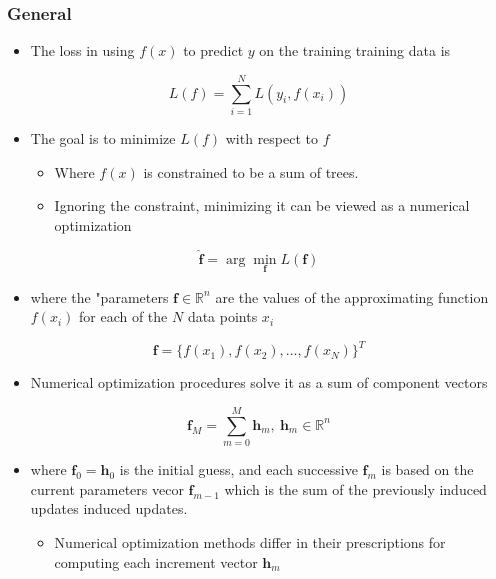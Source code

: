 \documentclass[11pt]{article}
\begin{document}
\subsubsection{General}
\label{sec:org23fed2b}
\begin{itemize}
\item The loss in using \(f(x)\) to predict \(y\) on the training training data is
\end{itemize}
\begin{equation}
  L(f) = \sum_{i=1}^N L(y_i,f(x_i))
\end{equation}
\begin{itemize}
\item The goal is to minimize \(L(f)\) with respect to \(f\)
\begin{itemize}
\item Where \(f(x)\) is constrained to be a sum of trees.
\item Ignoring the constraint, minimizing it can be viewed as a numerical optimization
\end{itemize}
\end{itemize}
\begin{equation}
  \pmb{\hat f} = \arg \min_{\pmb{f}} L(\pmb f) 
\end{equation}
\begin{itemize}
\item where the "parameters \(\pmb f \in \mathbb R ^n\) are the values of the approximating function \(f(x_i)\) for each of the \(N\) data points \(x_i\)
\end{itemize}
\begin{equation}
  \pmb f = \{f(x_1), f(x_2), \dots, f(x_N)\}^T
\end{equation}
\begin{itemize}
\item Numerical optimization procedures solve it as a sum of component vectors
\end{itemize}
\begin{equation}
	\pmb f_M = \sum_{m=0}^M \pmb h_m, \ \pmb h_m \in \mathbb R ^ n
\end{equation}
\begin{itemize}
\item where \(\pmb f_0 = \pmb h_0\) is the initial guess, and each successive \(\pmb f_m\) is based on the current parameters vecor \(\pmb f_{m-1}\) which is the sum of the previously induced updates induced updates.
\begin{itemize}
\item Numerical optimization methods differ in their prescriptions for computing each increment vector \(\pmb h_m\)
\end{itemize}
\end{itemize}
\end{document}
